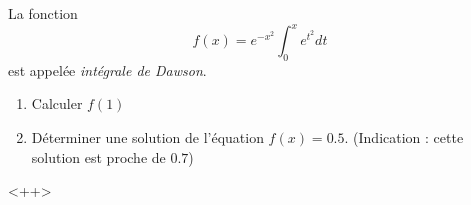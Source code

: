 \begin{exercice}\label{exoSC_serie4-0002}

	La fonction
	\begin{equation}
		f(x)= e^{-x^2}\int_0^x e^{t^2}dt
	\end{equation}
	est appelée \emph{intégrale de Dawson}.

	\begin{enumerate}

		\item
			Calculer $f(1)$
		\item
			Déterminer une solution de l'équation $f(x)=0.5$. (Indication : cette solution est proche de $0.7$)

	\end{enumerate}
	<++>

\end{exercice}
